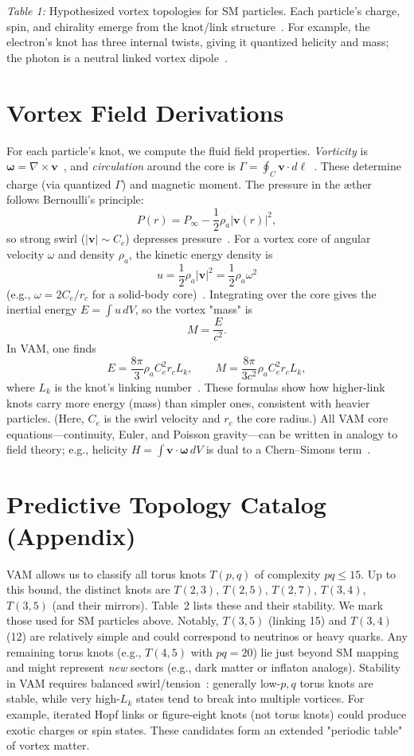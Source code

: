 \documentclass[a4paper,12pt]{article}
\begin{document}
\textit{Table 1:} Hypothesized vortex topologies for SM particles. Each particle's charge, spin, and chirality emerge from the knot/link structure~\cite{vam-lagrangian}. For example, the electron's knot has three internal twists, giving it quantized helicity and mass; the photon is a neutral linked vortex dipole~\cite{vam-lagrangian}.

\section*{Vortex Field Derivations}
For each particle's knot, we compute the fluid field properties. \textit{Vorticity} is $\boldsymbol{\omega} = \nabla \times \mathbf{v}$~\cite{helicity-appendix}, and \textit{circulation} around the core is $\Gamma = \oint_C \mathbf{v} \cdot d\boldsymbol{\ell}$~\cite{helicity-appendix}. These determine charge (via quantized $\Gamma$) and magnetic moment. The pressure in the æther follows Bernoulli's principle:
\[
P(r) = P_\infty - \frac{1}{2} \rho_a |\mathbf{v}(r)|^2,
\]
so strong swirl ($|\mathbf{v}| \sim C_e$) depresses pressure~\cite{vam-lagrangian}. For a vortex core of angular velocity $\omega$ and density $\rho_a$, the kinetic energy density is
\[
u = \frac{1}{2} \rho_a |\mathbf{v}|^2 = \frac{1}{2} \rho_a \omega^2
\]
(e.g., $\omega = 2C_e/r_c$ for a solid-body core)~\cite{mass-appendix}. Integrating over the core gives the inertial energy $E = \int u\,dV$, so the vortex "mass" is
\[
M = \frac{E}{c^2}.
\]
In VAM, one finds
\[
E = \frac{8\pi}{3} \rho_a C_e^2 r_c L_k, \qquad M = \frac{8\pi}{3c^2} \rho_a C_e^2 r_c L_k,
\]
where $L_k$ is the knot's linking number~\cite{mass-appendix, vam-lagrangian}. These formulas show how higher-link knots carry more energy (mass) than simpler ones, consistent with heavier particles. (Here, $C_e$ is the swirl velocity and $r_c$ the core radius.) All VAM core equations---continuity, Euler, and Poisson gravity---can be written in analogy to field theory; e.g., helicity $H = \int \mathbf{v} \cdot \boldsymbol{\omega}\,dV$ is dual to a Chern--Simons term~\cite{helicity-appendix}.

\section*{Predictive Topology Catalog (Appendix)}
VAM allows us to classify all torus knots $T(p,q)$ of complexity $pq \leq 15$. Up to this bound, the distinct knots are $T(2,3)$, $T(2,5)$, $T(2,7)$, $T(3,4)$, $T(3,5)$ (and their mirrors). Table~2 lists these and their stability. We mark those used for SM particles above. Notably, $T(3,5)$ (linking 15) and $T(3,4)$ (12) are relatively simple and could correspond to neutrinos or heavy quarks. Any remaining torus knots (e.g., $T(4,5)$ with $pq=20$) lie just beyond SM mapping and might represent \textit{new} sectors (e.g., dark matter or inflaton analogs). Stability in VAM requires balanced swirl/tension~\cite{mass-appendix, vam-lagrangian}: generally low-$p,q$ torus knots are stable, while very high-$L_k$ states tend to break into multiple vortices. For example, iterated Hopf links or figure-eight knots (not torus knots) could produce exotic charges or spin states. These candidates form an extended "periodic table" of vortex matter.
\end{document}
